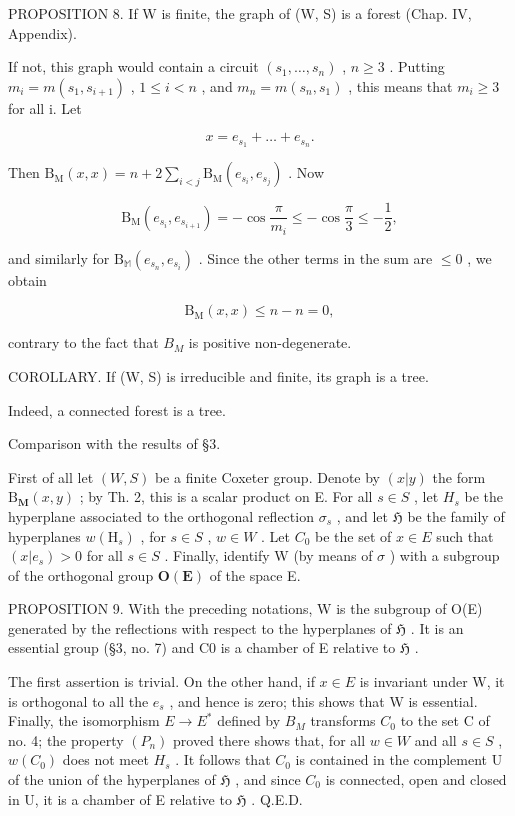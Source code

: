 PROPOSITION 8. If W is finite, the graph of (W, S) is a forest (Chap. IV, Appendix).

If not, this graph would contain a circuit \((s_{1},\ldots,s_{n})\) , \(n\geqslant3\) . Putting \(m_{i}=m(s_{1},s_{i+1})\) , \(1\leqslant i<n\) , and \(m_{n}=m(s_{n},s_{1})\) , this means that \(m_{i}\geqslant3\) for all i. Let

\[
x = e _ {s _ {1}} + \dots + e _ {s _ {n}}.
\]

Then \(\mathrm{B_M}(x,x) = n + 2\sum_{i < j}\mathrm{B_M}(e_{s_i},e_{s_j})\) . Now

\[
\mathrm{B} _ {\mathrm{M}} (e _ {s _ {i}}, e _ {s _ {i + 1}}) = - \cos \frac {\pi}{m _ {i}} \leqslant - \cos \frac {\pi}{3} \leqslant - \frac {1}{2},
\]

and similarly for \(\mathrm{B}_{\mathbb{M}}(e_{s_n}, e_{s_i})\) . Since the other terms in the sum are \(\leqslant 0\) , we obtain

\[
\mathrm{B} _ {\mathrm{M}} (x, x) \leqslant n - n = 0,
\]

contrary to the fact that \(B_{M}\) is positive non-degenerate.

COROLLARY. If (W, S) is irreducible and finite, its graph is a tree.

Indeed, a connected forest is a tree.

Comparison with the results of §3.

First of all let \((W,S)\) be a finite Coxeter group. Denote by \((x|y)\) the form \(\mathrm{B}_{\mathbf{M}}(x,y)\) ; by Th. 2, this is a scalar product on E. For all \(s \in S\) , let \(H_{s}\) be the hyperplane associated to the orthogonal reflection \(\sigma_{s}\) , and let \(\mathfrak{H}\) be the family of hyperplanes \(w(\mathrm{H}_{s})\) , for \(s \in S\) , \(w \in W\) . Let \(C_{0}\) be the set of \(x \in E\) such that \((x|e_{s}) > 0\) for all \(s \in S\) . Finally, identify W (by means of \(\sigma\) ) with a subgroup of the orthogonal group \(\mathbf{O}(\mathbf{E})\) of the space E.

PROPOSITION 9. With the preceding notations, W is the subgroup of O(E) generated by the reflections with respect to the hyperplanes of \(\mathfrak{H}\) . It is an essential group (§3, no. 7) and C0 is a chamber of E relative to \(\mathfrak{H}\) .

The first assertion is trivial. On the other hand, if \(x \in E\) is invariant under W, it is orthogonal to all the \(e_{s}\) , and hence is zero; this shows that W is essential. Finally, the isomorphism \(E \to E^{*}\) defined by \(B_{M}\) transforms \(C_{0}\) to the set C of no. 4; the property \((P_{n})\) proved there shows that, for all \(w \in W\) and all \(s \in S\) , \(w(C_0)\) does not meet \(H_s\) . It follows that \(C_0\) is contained in the complement U of the union of the hyperplanes of \(\mathfrak{H}\) , and since \(C_0\) is connected, open and closed in U, it is a chamber of E relative to \(\mathfrak{H}\) . Q.E.D.

